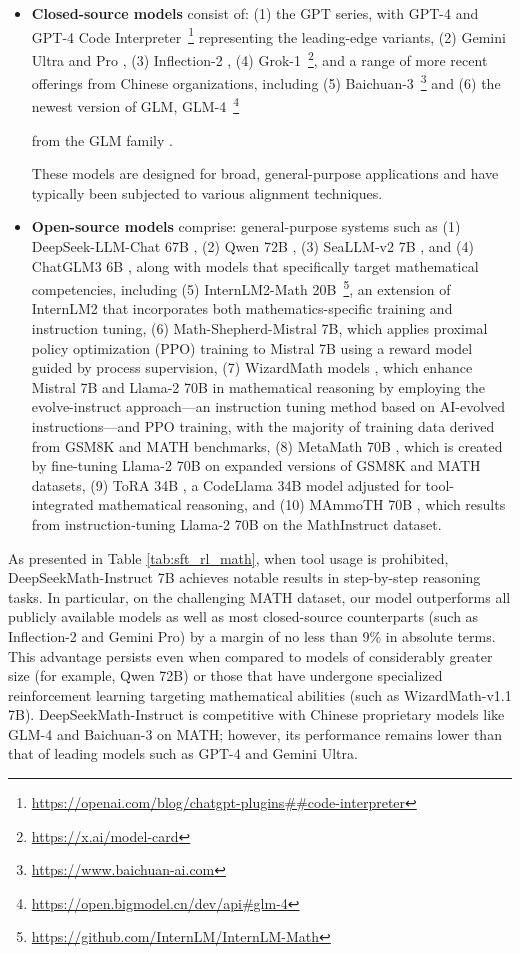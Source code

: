 \begin{itemize}[topsep=0pt]
\begin{itemize}[topsep=0pt]
    \item \textbf{Closed-source models} consist of: (1) the GPT series, with GPT-4 \citep{gpt4} and GPT-4 Code Interpreter~\footnote{\url{https://openai.com/blog/chatgpt-plugins\#\#code-interpreter}} representing the leading-edge variants, (2) Gemini Ultra and Pro \citep{gemini}, (3) Inflection-2 \citep{inflection-2}, (4) Grok-1~\footnote{\url{https://x.ai/model-card}}, and a range of more recent offerings from Chinese organizations, including (5) Baichuan-3~\footnote{\url{https://www.baichuan-ai.com}} and (6) the newest version of GLM, GLM-4~\footnote{\url{https://open.bigmodel.cn/dev/api\#glm-4}}

    from the GLM family \citep{glm}.

These models are designed for broad, general-purpose applications and have typically been subjected to various alignment techniques.
    \item \textbf{Open-source models} comprise: general-purpose systems such as (1) DeepSeek-LLM-Chat 67B \citep{deepseek-llm}, (2) Qwen 72B \citep{qwen}, (3) SeaLLM-v2 7B \citep{seallm}, and (4) ChatGLM3 6B \citep{chatglm3}, along with models that specifically target mathematical competencies, including (5) InternLM2-Math 20B~\footnote{\url{https://github.com/InternLM/InternLM-Math}}, an extension of InternLM2 that incorporates both mathematics-specific training and instruction tuning, (6) Math-Shepherd-Mistral 7B, which applies proximal policy optimization (PPO) training \citep{schulman2017proximal} to Mistral 7B \citep{mistral} using a reward model guided by process supervision, (7) WizardMath models \citep{wizardmath}, which enhance Mistral 7B and Llama-2 70B \citep{llama2} in mathematical reasoning by employing the evolve-instruct approach—an instruction tuning method based on AI-evolved instructions—and PPO training, with the majority of training data derived from GSM8K and MATH benchmarks, (8) MetaMath 70B \citep{metamath}, which is created by fine-tuning Llama-2 70B on expanded versions of GSM8K and MATH datasets, (9) ToRA 34B \cite{tora}, a CodeLlama 34B model adjusted for tool-integrated mathematical reasoning, and (10) MAmmoTH 70B \citep{MathInstruct}, which results from instruction-tuning Llama-2 70B on the MathInstruct dataset.
\end{itemize}

As presented in Table \ref{tab:sft_rl_math}, when tool usage is prohibited, DeepSeekMath-Instruct 7B achieves notable results in step-by-step reasoning tasks. In particular, on the challenging MATH dataset, our model outperforms all publicly available models as well as most closed-source counterparts (such as Inflection-2 and Gemini Pro) by a margin of no less than 9\% in absolute terms. This advantage persists even when compared to models of considerably greater size (for example, Qwen 72B) or those that have undergone specialized reinforcement learning targeting mathematical abilities (such as WizardMath-v1.1 7B). DeepSeekMath-Instruct is competitive with Chinese proprietary models like GLM-4 and Baichuan-3 on MATH; however, its performance remains lower than that of leading models such as GPT-4 and Gemini Ultra.


\end{itemize}
